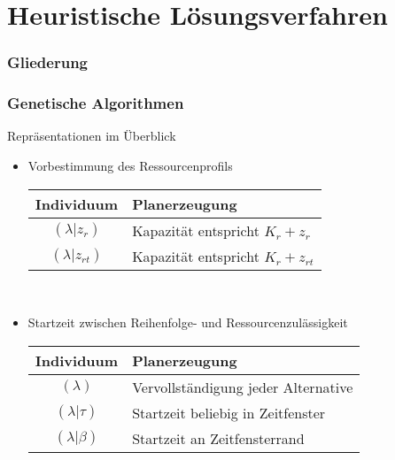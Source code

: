 
\section{Heuristische Lösungsverfahren}

\begin{frame}[noframenumbering]
\frametitle{Gliederung}
\end{frame}

\begin{frame}
\frametitle{Genetische Algorithmen}
Repräsentationen im Überblick
\begin{itemize}	
	\item \small{Vorbestimmung des Ressourcenprofils}\\[2mm]
	\begin{small}
		\begin{tabular}{cp{7.5cm}}
			\hline
			Individuum & Planerzeugung\\
			\hline
			$(\lambda|z_r)$ & Kapazität entspricht $K_r+z_{r}$\\
			$(\lambda|z_{rt})$ & Kapazität entspricht $K_r+z_{rt}$\\			
		\end{tabular}
	\end{small}\\[4mm]
	
	\item \small{Startzeit zwischen Reihenfolge- und Ressourcenzulässigkeit}\\[2mm]
	\begin{small}
		\begin{tabular}{cp{7.5cm}}
			\hline
			Individuum & Planerzeugung\\
			\hline
			$(\lambda)$ & Vervollständigung jeder Alternative\\	
			$(\lambda|\tau)$& Startzeit beliebig in Zeitfenster\\
			$(\lambda|\beta)$& Startzeit an Zeitfensterrand\\			
		\end{tabular}
	\end{small}	
\end{itemize}
\end{frame}


